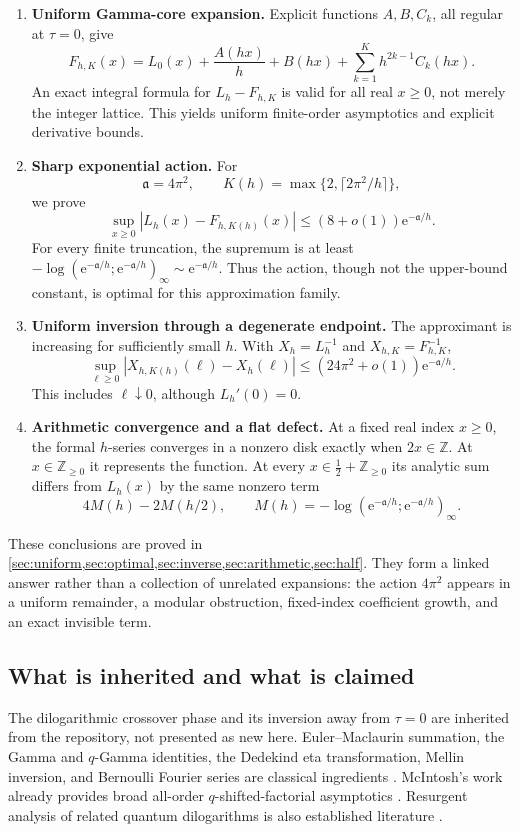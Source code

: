 \documentclass[11pt,a4paper]{article}
\numberwithin{equation}{section}
\theoremstyle{definition}
\newcommand{\Z}{\mathbb Z}
\newcommand{\ee}{\mathrm e}
\newcommand{\Act}{\mathfrak a}
\begin{document}
\begin{enumerate}[label=\textbf{\arabic*.},leftmargin=*]
\item \textbf{Uniform Gamma-core expansion.} Explicit functions $A,B,C_k$, all regular at $\tau=0$, give
\[
F_{h,K}(x)=L_0(x)+\frac{A(hx)}h+B(hx)
                 +\sum_{k=1}^K h^{2k-1}C_k(hx).
\]
An exact integral formula for $L_h-F_{h,K}$ is valid for all real $x\ge0$, not merely the integer lattice. This yields uniform finite-order asymptotics and explicit derivative bounds.
\item \textbf{Sharp exponential action.} For
\[
\Act=4\pi^2,\qquad K(h)=\max\{2,\lceil2\pi^2/h\rceil\},
\]
we prove
\[
\sup_{x\ge0}|L_h(x)-F_{h,K(h)}(x)|
   \le (8+o(1))\ee^{-\Act/h}.
\]
For every finite truncation, the supremum is at least
$-\log(\ee^{-\Act/h};\ee^{-\Act/h})_\infty\sim\ee^{-\Act/h}$.
Thus the action, though not the upper-bound constant, is optimal for this approximation family.
\item \textbf{Uniform inversion through a degenerate endpoint.} The approximant is increasing for sufficiently small $h$. With $X_h=L_h^{-1}$ and $X_{h,K}=F_{h,K}^{-1}$,
\[
\sup_{\ell\ge0}|X_{h,K(h)}(\ell)-X_h(\ell)|
\le (24\pi^2+o(1))\ee^{-\Act/h}.
\]
This includes $\ell\downarrow0$, although $L_h'(0)=0$.
\item \textbf{Arithmetic convergence and a flat defect.} At a fixed real index $x\ge0$, the formal $h$-series converges in a nonzero disk exactly when $2x\in\Z$. At $x\in\Z_{\ge0}$ it represents the function. At every $x\in\tfrac12+\Z_{\ge0}$ its analytic sum differs from $L_h(x)$ by the same nonzero term
\[
4M(h)-2M(h/2),\qquad
M(h)=-\log(\ee^{-\Act/h};\ee^{-\Act/h})_\infty.
\]
\end{enumerate}

These conclusions are proved in \cref{sec:uniform,sec:optimal,sec:inverse,sec:arithmetic,sec:half}. They form a linked answer rather than a collection of unrelated expansions: the action $4\pi^2$ appears in a uniform remainder, a modular obstruction, fixed-index coefficient growth, and an exact invisible term.

\subsection{What is inherited and what is claimed}
The dilogarithmic crossover phase and its inversion away from $\tau=0$ are inherited from the repository, not presented as new here. Euler--Maclaurin summation, the Gamma and $q$-Gamma identities, the Dedekind eta transformation, Mellin inversion, and Bernoulli Fourier series are classical ingredients \cite{dlmfem,dlmfqgamma,dlmfeta,dlmfhurwitz,dlmfbern}. McIntosh's work already provides broad all-order $q$-shifted-factorial asymptotics \cite{mcintosh}. Resurgent analysis of related quantum dilogarithms is also established literature \cite{gk,sauzin}.
\end{document}
